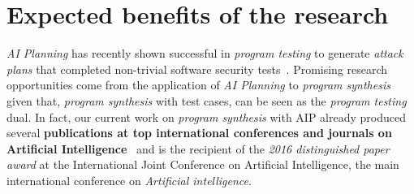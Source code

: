 \documentclass[10pt,a4paper]{paper}
\begin{document}
\section{Expected benefits of the research}
\label{subsec:beneficios}
{\em AI Planning} has recently shown successful in {\em program testing} to generate {\em attack plans} that completed non-trivial software security tests~\cite{hoffmann2015simulated,steinmetz2016revisiting,shmaryahu2016constructing,steinmetz2016goal}. Promising research opportunities come from the application of {\em AI Planning} to {\em program synthesis} given that, {\em program synthesis} with test cases, can be seen as the {\em program testing} dual. In fact, our current work on {\em program synthesis} with AIP already produced several {\bf publications at top international conferences and journals on Artificial Intelligence}~\cite{segovia2017generating,sergio:aprogramingb:ijcai16,sergio:aprograming:ijcai16,sergio:aprograming:icaps16,javi-icaps17,segovia:FSC:JAIR2018,segovia:programs:AIJ19} and is the recipient of the {\it 2016 distinguished paper award} at the International Joint Conference on Artificial Intelligence, the main international conference on {\em Artificial intelligence}. 
\end{document}
